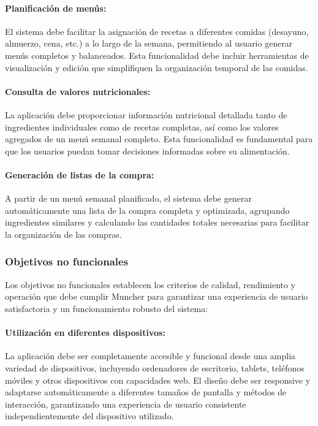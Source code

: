 \paragraph*{Planificación de menús:}
El sistema debe facilitar la asignación de recetas a diferentes comidas (desayuno, almuerzo, cena, etc.) a lo largo de la semana, permitiendo al usuario generar menús completos y balanceados. Esta funcionalidad debe incluir herramientas de visualización y edición que simplifiquen la organización temporal de las comidas.

\paragraph*{Consulta de valores nutricionales:}
La aplicación debe proporcionar información nutricional detallada tanto de ingredientes individuales como de recetas completas, así como los valores agregados de un menú semanal completo. Esta funcionalidad es fundamental para que los usuarios puedan tomar decisiones informadas sobre su alimentación.

\paragraph*{Generación de listas de la compra:}
A partir de un menú semanal planificado, el sistema debe generar automáticamente una lista de la compra completa y optimizada, agrupando ingredientes similares y calculando las cantidades totales necesarias para facilitar la organización de las compras.

\subsubsection*{Objetivos no funcionales}

Los objetivos no funcionales establecen los criterios de calidad, rendimiento y operación que debe cumplir Muncher para garantizar una experiencia de usuario satisfactoria y un funcionamiento robusto del sistema:

\paragraph{Utilización en diferentes dispositivos:}
La aplicación debe ser completamente accesible y funcional desde una amplia variedad de dispositivos, incluyendo ordenadores de escritorio, tablets, teléfonos móviles y otros dispositivos con capacidades web. El diseño debe ser responsive y adaptarse automáticamente a diferentes tamaños de pantalla y métodos de interacción, garantizando una experiencia de usuario consistente independientemente del dispositivo utilizado.

